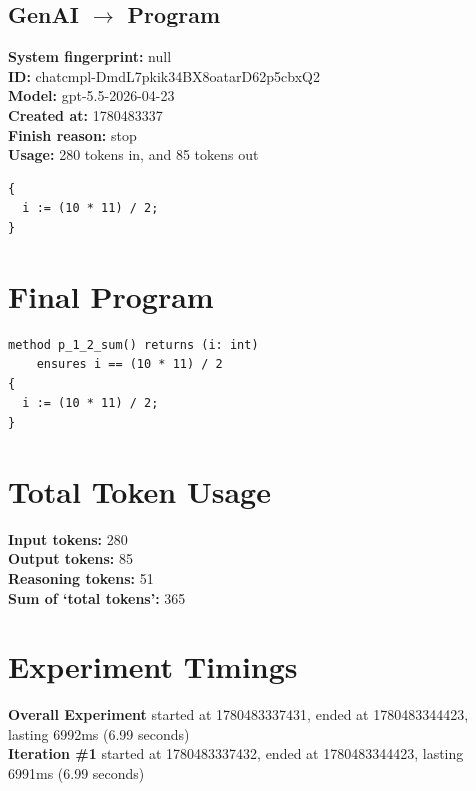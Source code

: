 \documentclass{article}
\begin{document}
\subsection*{GenAI $\rightarrow$ Program}
\textbf{System fingerprint: }null
\\\textbf{ID: }chatcmpl-DmdL7pkik34BX8oatarD62p5cbxQ2
\\\textbf{Model: }gpt-5.5-2026-04-23
\\\textbf{Created at: }1780483337
\\\textbf{Finish reason: }stop
\\\textbf{Usage: }280 tokens in, and 85 tokens out
\begin{lstlisting}
{
  i := (10 * 11) / 2;
}
\end{lstlisting}
\section*{Final Program}
\begin{lstlisting}
method p_1_2_sum() returns (i: int)
	ensures i == (10 * 11) / 2
{
  i := (10 * 11) / 2;
}
\end{lstlisting}
\section*{Total Token Usage}
\textbf{Input tokens: }280
\\\textbf{Output tokens: }85
\\\textbf{Reasoning tokens: }51
\\\textbf{Sum of `total tokens': }365
\section*{Experiment Timings}
\textbf{Overall Experiment} started at 1780483337431, ended at 1780483344423, lasting 6992ms (6.99 seconds)
\\\textbf{Iteration \#1} started at 1780483337432, ended at 1780483344423, lasting 6991ms (6.99 seconds)
\end{document}
